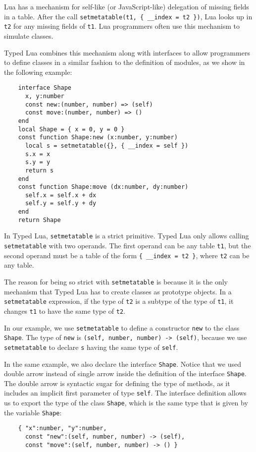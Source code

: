 Lua has a mechanism for self-like (or JavaScript-like) delegation of
missing fields in a table.
After the call \texttt{setmetatable(t1, \{ \string_\string_index = t2 \})},
Lua looks up in \texttt{t2} for any missing fields of \texttt{t1}.
Lua programmers often use this mechanism to simulate classes.

Typed Lua combines this mechanism along with interfaces to allow
programmers to define classes in a similar fashion to the definition
of modules, as we show in the following example:
\begin{verbatim}
    interface Shape
      x, y:number
      const new:(number, number) => (self)
      const move:(number, number) => ()
    end
    local Shape = { x = 0, y = 0 }
    const function Shape:new (x:number, y:number)
      local s = setmetatable({}, { __index = self })
      s.x = x
      s.y = y
      return s
    end
    const function Shape:move (dx:number, dy:number)
      self.x = self.x + dx
      self.y = self.y + dy
    end
    return Shape
\end{verbatim}

In Typed Lua, \texttt{setmetatable} is a strict primitive.
Typed Lua only allows calling \texttt{setmetatable} with
two operands.
The first operand can be any table \texttt{t1}, but the second operand
must be a table of the form \texttt{\{ \string_\string_index = t2 \}},
where \texttt{t2} can be any table.

The reason for being so strict with \texttt{setmetatable} is because
it is the only mechanism that Typed Lua has to create classes
as prototype objects.
In a \texttt{setmetatable} expression, if the type of \texttt{t2}
is a subtype of the type of \texttt{t1}, it changes \texttt{t1} to
have the same type of \texttt{t2}.

In our example, we use \texttt{setmetatable} to define a constructor
\texttt{new} to the class \texttt{Shape}.
The type of \texttt{new} is \texttt{(self, number, number) -> (self)},
because we use \texttt{setmetatable} to declare \texttt{s} having
the same type of \texttt{self}.

In the same example, we also declare the interface \texttt{Shape}.
Notice that we used double arrow instead of single arrow inside the
definition of the interface \texttt{Shape}.
The double arrow is syntactic sugar for defining the type of methods,
as it includes an implicit first parameter of type \texttt{self}.
The interface definition allows us to export the type of the class \texttt{Shape},
which is the same type that is given by the variable \texttt{Shape}:
\begin{verbatim}
    { "x":number, "y":number,
      const "new":(self, number, number) -> (self),
      const "move":(self, number, number) -> () }
\end{verbatim}

